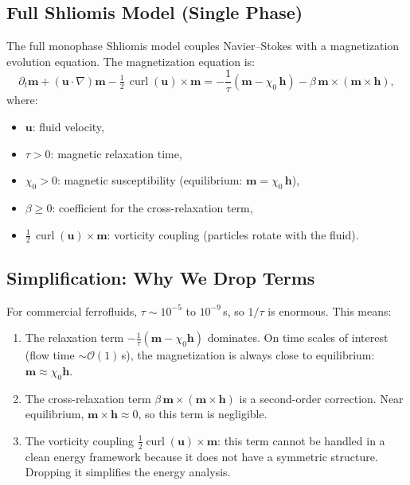 \documentclass[11pt,a4paper]{article}
\theoremstyle{definition}
\theoremstyle{remark}
\newcommand{\dt}{\partial_t}
\newcommand{\curl}{\operatorname{curl}}
\newcommand{\grad}{\nabla}
\newcommand{\half}{\tfrac{1}{2}}
\newcommand{\bfu}{\bm{u}}
\newcommand{\bfm}{\bm{m}}
\newcommand{\bfh}{\bm{h}}
\begin{document}
\subsection{Full Shliomis Model (Single Phase)}

The full monophase Shliomis model couples Navier--Stokes with a
magnetization evolution equation. The magnetization equation is:
\begin{equation}
  \label{eq:shliomis-full}
  \dt\bfm + (\bfu \cdot \grad)\bfm - \half\,\curl(\bfu) \times \bfm
  = -\frac{1}{\tau}\left(\bfm - \chi_0\,\bfh\right)
    - \beta\,\bfm \times (\bfm \times \bfh),
\end{equation}
where:
\begin{itemize}[nosep]
  \item $\bfu$: fluid velocity,
  \item $\tau > 0$: magnetic relaxation time,
  \item $\chi_0 > 0$: magnetic susceptibility (equilibrium: $\bfm = \chi_0\,\bfh$),
  \item $\beta \geq 0$: coefficient for the cross-relaxation term,
  \item $\half\,\curl(\bfu) \times \bfm$: vorticity coupling (particles
        rotate with the fluid).
\end{itemize}

\subsection{Simplification: Why We Drop Terms}

For commercial ferrofluids, $\tau \sim 10^{-5}$ to $10^{-9}$\,s, so
$1/\tau$ is enormous. This means:

\begin{enumerate}
  \item The relaxation term $-\frac{1}{\tau}(\bfm - \chi_0\bfh)$ dominates.
        On time scales of interest (flow time $\sim \mathcal{O}(1)$\,s),
        the magnetization is always close to equilibrium:
        $\bfm \approx \chi_0\bfh$.

  \item The cross-relaxation term $\beta\,\bfm \times (\bfm \times \bfh)$
        is a second-order correction. Near equilibrium,
        $\bfm \times \bfh \approx 0$, so this term is negligible.

  \item The vorticity coupling $\half\curl(\bfu) \times \bfm$:
        this term cannot be handled in a clean energy framework because
        it does not have a symmetric structure. Dropping it simplifies
        the energy analysis.
\end{enumerate}
\end{document}
